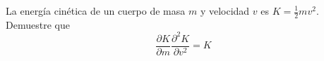 \item La energía cinética de un cuerpo de masa $m$ y velocidad $v$ es $K = \frac{1}{2}mv^2$. Demuestre que
\[ \frac{\partial K}{\partial m} \frac{\partial^2 K}{\partial v^2} = K \]
